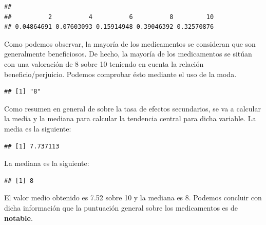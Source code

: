 \documentclass[spanish,]{article}
\newenvironment{Shaded}{\begin{snugshade}}{\end{snugshade}}
\newcommand{\KeywordTok}[1]{\textcolor[rgb]{0.13,0.29,0.53}{\textbf{#1}}}
\newcommand{\CommentTok}[1]{\textcolor[rgb]{0.56,0.35,0.01}{\textit{#1}}}
\newcommand{\OperatorTok}[1]{\textcolor[rgb]{0.81,0.36,0.00}{\textbf{#1}}}
\newcommand{\NormalTok}[1]{#1}
\begin{document}
\begin{verbatim}
## 
##          2          4          6          8         10 
## 0.04864691 0.07603093 0.15914948 0.39046392 0.32570876
\end{verbatim}

Como podemos observar, la mayoría de los medicamentos se consideran que
son generalmente beneficiosos. De hecho, la mayoría de los medicamentos
se sitúan con una valoración de 8 sobre 10 teniendo en cuenta la
relación beneficio/perjuicio. Podemos comprobar ésto mediante el uso de
la moda.

\begin{Shaded}
\end{Shaded}

\begin{verbatim}
## [1] "8"
\end{verbatim}

Como resumen en general de sobre la tasa de efectos secundarios, se va a
calcular la media y la mediana para calcular la tendencia central para
dicha variable. La media es la siguiente:

\begin{Shaded}
\end{Shaded}

\begin{verbatim}
## [1] 7.737113
\end{verbatim}

La mediana es la siguiente:

\begin{Shaded}
\end{Shaded}

\begin{verbatim}
## [1] 8
\end{verbatim}

El valor medio obtenido es 7.52 sobre 10 y la mediana es 8. Podemos
concluir con dicha información que la puntuación general sobre los
medicamentos es de \textbf{notable}.
\end{document}
